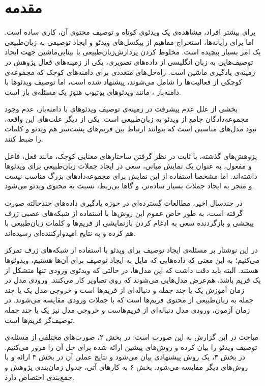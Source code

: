 \section{مقدمه}\label{intro}
برای بیشتر افراد، مشاهده‌ی یک ویدئو‌ی کوتاه و توصیف محتوی آن، کاری ساده است. اما برای رایانه‌ها، استخراج مفاهیم از پیکسل‌های ویدئو و ایجاد توصیفی به زبان‌طبیعی یک امر بسیار پیچیده‌ است. 
مخلوط کردن پردازش‌زبان‌طبیعی با بینایی‌ماشین 
جهت ایجاد توصیف‌هایی به زبان انگلیسی از داده‌های تصویری، یکی از زمینه‌های فعال پژوهش در زمینه‌ی یادگیری ماشین است.
راه‌حل‌های متعددی برای دامنه‌های کوچک که مجموعه‌ی کوچکی از فعالیت‌ها را شامل می‌شوند، پیشنهاد شده است، اما توصیف ویدئو‌ها با دامنه‌باز
، مانند ویدئو‌های یوتیوب هنوز یک مسئله‌ی باز است.

بخشی از علل عدم پیشرفت در زمینه‌ی توصیف ویدئو‌های با دامنه‌باز، عدم وجود مجموعه‌دادگان جامع از ویدئو به زبان‌طبیعی است. یکی از دیگر علت‌های این واقعه، نبود مدل‌های مناسبی است که بتوانند ارتباط بین فریم‌های پشت‌سر هم ویدئو و کلمات را ضبط کنند.

پژوهش‌های گذشته، با ثابت در نظر گرفتن ساختار‌های معنایی کوچک، مانند فعل، فاعل و مفعول، به عنوان یک نمایش میانی، سعی در ایجاد جملات زبان‌طبیعی برای ویدئو‌ها داشته‌اند. اما مشخصا استفاده از این نمایش برای مجموعه‌دادها‌ی بزرگ مناسب نیست و منجر به ایجاد جملات بسیار ساده‌تر، و گاها بی‌ربط، نسبت به محتوی ویدئو می‌شود.

در چند‌سال اخیر، مطالعات گسترده‌ای در حوزه یادگیری داده‌های چند‌حالته
صورت گرفته است،  به طور خاص عموم این روش‌ها با استفاده از شبکه‌های عصبی ژرف پیچشی
و 
بازگردنده‌
سعی به ادغام کردن بازنمایشی از فریم‌ها و کلمات زبان‌طبیعی با هم کرده و به نتایج امیدوار‌کننده‌ای رسیده‌اند.
 
 در این نوشتار بر مسئله‌ی ایجاد توصیف برای ویدئو با استفاده از شبکه‌های ژرف تمرکز می‌کنیم؛ به این معنی که داده‌هایی که مایل به ایجاد توصیف برای آن‌ها هستیم، ویدوئوها هستند. البته باید دقت‌ داشت که این مدل‌ها، در حالتی که ویدئو‌ی ورودی تنها متشکل از یک فریم باشد، هم‌عرض مدل‌هایی می‌شوند که روی تصاویر کار می‌کنند. ورودی مدل در زمان آموزش یک یا چند جمله و دنباله‌ای از فریم‌ها است و خروجی مدل یک یا چند جمله به زبان‌طبیعی از محتوی فریم‌ها  است که با جملات ورودی مقایسه‌ می‌شوند.
 در زمان آزمون، ورودی مدل دنباله‌ای از فریم‌هاست و خروجی مدل نیز یک یا چند جمله توصیف‌گر فریم‌ها است.
 
 مباحث در این گزارش به این صورت است: در بخش ۲، صورت‌های مختلفی از مسئله‌ی توصیف ویدئو را بیان کرده و روش‌های پیشین ارائه شده برای حل آن‌ را مرور می‌کنیم. در بخش ۳، یک روش پیشنهادی بیان می‌شود و نتایج عملی آن در بخش ۴ ارائه و با روش‌های دیگر مقایسه می‌شود. بخش ۶ به کارهای آتی، جدول زمان‌بندی پژوهش و جمع‌بندی اختصاص دارد.
 

